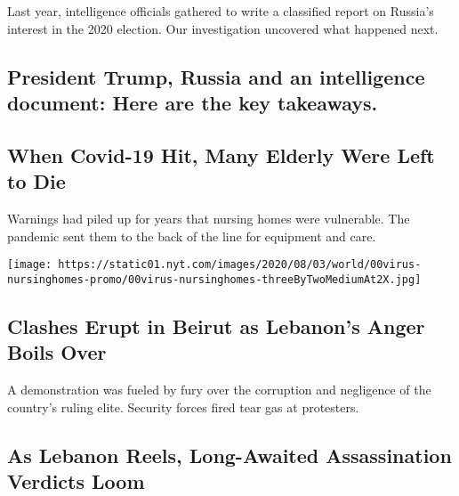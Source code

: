 Last year, intelligence officials gathered to write a classified report
on Russia's interest in the 2020 election. Our investigation uncovered
what happened next.

\href{/2020/08/08/us/politics/trump-russia.html}{}

\hypertarget{president-trump-russia-and-an-intelligence-document-here-are-the-key-takeaways}{%
\subsection{President Trump, Russia and an intelligence document: Here
are the key
takeaways.}\label{president-trump-russia-and-an-intelligence-document-here-are-the-key-takeaways}}

\href{/2020/08/08/world/europe/coronavirus-nursing-homes-elderly.html}{}

\hypertarget{when-covid-19-hit-many-elderly-were-left-to-die}{%
\subsection{When Covid-19 Hit, Many Elderly Were Left to
Die}\label{when-covid-19-hit-many-elderly-were-left-to-die}}

Warnings had piled up for years that nursing homes were vulnerable. The
pandemic sent them to the back of the line for equipment and care.

\href{/2020/08/08/world/europe/coronavirus-nursing-homes-elderly.html}{}

\texttt{[image: https://static01.nyt.com/images/2020/08/03/world/00virus-nursinghomes-promo/00virus-nursinghomes-threeByTwoMediumAt2X.jpg]}

\href{/2020/08/08/world/middleeast/Beirut-explosion-protests-lebanon.html}{}

\hypertarget{clashes-erupt-in-beirut-as-lebanons-anger-boils-over}{%
\subsection{Clashes Erupt in Beirut as Lebanon's Anger Boils
Over}\label{clashes-erupt-in-beirut-as-lebanons-anger-boils-over}}

A demonstration was fueled by fury over the corruption and negligence of
the country's ruling elite. Security forces fired tear gas at
protesters.

\href{/2020/08/08/world/middleeast/hariri-assassination-trial-hague.html}{}

\hypertarget{as-lebanon-reels-long-awaited-assassination-verdicts-loom}{%
\subsection{As Lebanon Reels, Long-Awaited Assassination Verdicts
Loom}\label{as-lebanon-reels-long-awaited-assassination-verdicts-loom}}

